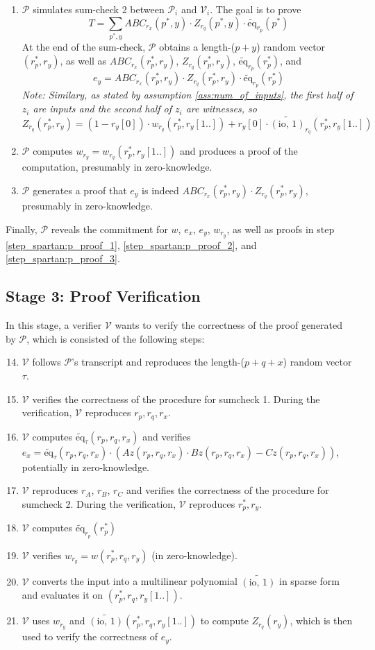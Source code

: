 \documentclass{article}
\renewcommand{\P}{\mathcal{P}}
\newcommand{\V}{\mathcal{V}}
\newcommand{\eq}{\widetilde{\mbox{eq}}}
\newcommand{\io}{\widetilde{(\mbox{io, 1})}}
\begin{document}
\begin{enumerate}
    \item $\P$ simulates sum-check 2 between $\P_i$ and $\V_i$. The goal is to prove
    $$\displaystyle T = \sum_{p^*, y} ABC_{r_x}(p^*, y)\cdot Z_{r_q}(p^*, y) \cdot \eq_{r_p}(p^*)$$
    At the end of the sum-check, $\P$ obtains a length-($p + y$) random vector $(r_p^*, r_y)$, as well as $ABC_{r_x}(r_p^*, r_y)$, $Z_{r_q}(r_p^*, r_y)$, $\eq_{r_p}(r_p^*)$, and
    $$e_y = ABC_{r_x}(r_p^*, r_y)\cdot Z_{r_q}(r_p^*, r_y)\cdot \eq_{r_p}(r_p^*)$$
    \emph{Note: Similary, as stated by assumption \ref{ass:num_of_inputs}, the first half of $z_i$ are inputs and the second half of $z_i$ are witnesses, so $Z_{r_q}(r_p^*, r_y) = (1 - r_y[0])\cdot w_{r_q}(r_p^*, r_y[1..]) + r_y[0]\cdot \io_{r_q}(r_p^*, r_y[1..])$}
    \item $\P$ computes $w_{r_y} = w_{r_q}(r_p^*, r_y[1..])$ and produces a proof of the computation, presumably in zero-knowledge.\label{step:p_proof_2}
    \item $\P$ generates a proof that $e_y$ is indeed $ABC_{r_x}(r_p^*, r_y)\cdot Z_{r_q}(r_p^*, r_y)$, presumably in zero-knowledge.\label{step:p_proof_3}
\end{enumerate}
Finally, $\P$ reveals the commitment for $w$, $e_x$, $e_y$, $w_{r_y}$, as well as proofs in step \ref{step_spartan:p_proof_1}, \ref{step_spartan:p_proof_2}, and \ref{step_spartan:p_proof_3}.

\subsection{Stage 3: Proof Verification}\label{stage:verifier}
In this stage, a verifier $\V$ wants to verify the correctness of the proof generated by $\P$, which is consisted of the following steps:
\begin{enumerate}
    \setcounter{enumi}{13}
    \item $\V$ follows $\P$'s transcript and reproduces the length-($p + q + x$) random vector $\tau$.
    \item $\V$ verifies the correctness of the procedure for sumcheck 1. During the verification, $\V$ reproduces $r_p, r_q, r_x$.
    \item $\V$ computes $\eq_\tau(r_p, r_q, r_x)$ and verifies $e_x = \eq_\tau(r_p, r_q, r_x)\cdot (Az(r_p, r_q, r_x)\cdot Bz(r_p, r_q, r_x) - Cz(r_p, r_q, r_x))$, potentially in zero-knowledge.
    \item $\V$ reproduces $r_A$, $r_B$, $r_C$ and verifies the correctness of the procedure for sumcheck 2. During the verification, $\V$ reproduces $r_p^*, r_y$.
    \item $\V$ computes $\eq_{r_p}(r_p^*)$
    \item $\V$ verifies $w_{r_y} = w(r_p^*, r_q, r_y)$ (in zero-knowledge).\label{step:w-verification}
    \item $\V$ converts the input into a multilinear polynomial $\io$ in sparse form and evaluates it on $(r_p^*, r_q, r_y[1..])$.\label{step:io-compute}
    \item $\V$ uses $w_{r_y}$ and $\io(r_p^*, r_q, r_y[1..])$ to compute $Z_{r_q}(r_y)$, which is then used to verify the correctness of $e_y$.
\end{enumerate}
\end{document}
